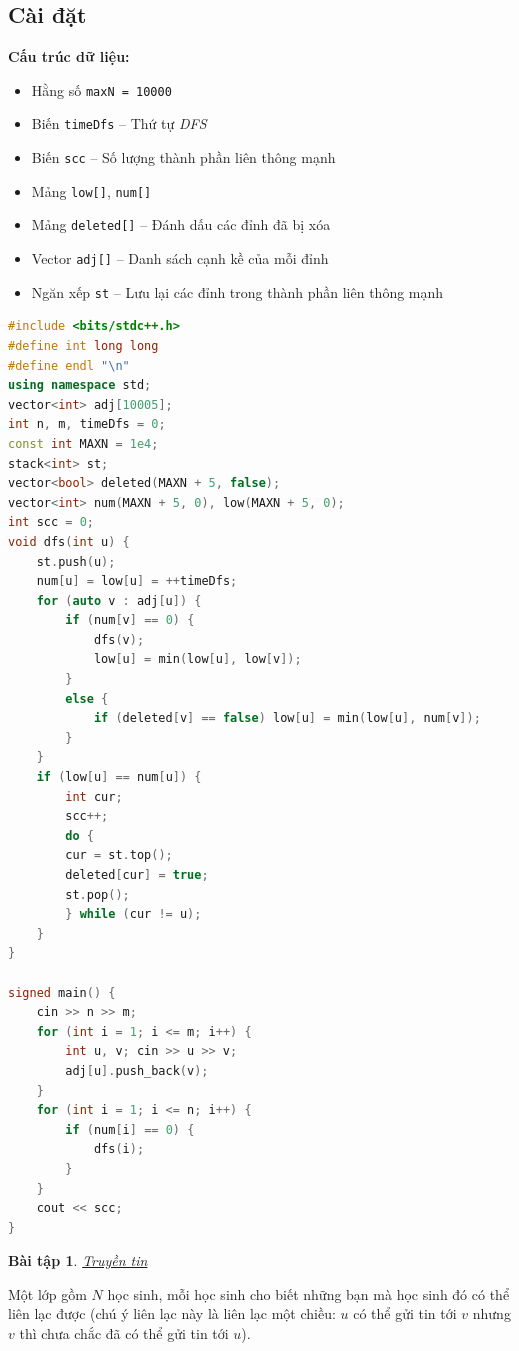 \documentclass{article}
\newtheorem{baitap}{Bài tập}
\begin{document}
\subsection*{Cài đặt}

\textbf{Cấu trúc dữ liệu:}
\begin{itemize}
    \item Hằng số \texttt{maxN = 10000}
    \item Biến \texttt{timeDfs} -- Thứ tự \textit{DFS}
    \item Biến \texttt{scc} -- Số lượng thành phần liên thông mạnh
    \item Mảng \texttt{low[]}, \texttt{num[]}
    \item Mảng \texttt{deleted[]} -- Đánh dấu các đỉnh đã bị xóa
    \item Vector \texttt{adj[]} -- Danh sách cạnh kề của mỗi đỉnh
    \item Ngăn xếp \texttt{st} -- Lưu lại các đỉnh trong thành phần liên thông mạnh
\end{itemize}

\begin{lstlisting}[language=C++]
#include <bits/stdc++.h>
#define int long long
#define endl "\n"
using namespace std;
vector<int> adj[10005];
int n, m, timeDfs = 0;
const int MAXN = 1e4;
stack<int> st;
vector<bool> deleted(MAXN + 5, false);
vector<int> num(MAXN + 5, 0), low(MAXN + 5, 0);
int scc = 0;
void dfs(int u) {
    st.push(u);
    num[u] = low[u] = ++timeDfs;
    for (auto v : adj[u]) {
        if (num[v] == 0) {
            dfs(v);
            low[u] = min(low[u], low[v]);
        }
        else {
            if (deleted[v] == false) low[u] = min(low[u], num[v]);
        }
    }
    if (low[u] == num[u]) {
        int cur;
        scc++;
        do {
        cur = st.top();
        deleted[cur] = true;
        st.pop();
        } while (cur != u);
    }
}

signed main() {
    cin >> n >> m;
    for (int i = 1; i <= m; i++) {
        int u, v; cin >> u >> v;
        adj[u].push_back(v);
    }    
    for (int i = 1; i <= n; i++) {
        if (num[i] == 0) {
            dfs(i);
        }
    }
    cout << scc;
}
\end{lstlisting}

\begin{baitap}
    \href{https://oj.vnoi.info/problem/message}{Truyền tin}
\end{baitap}

Một lớp gồm $N$ học sinh, mỗi học sinh cho biết những bạn mà học sinh đó có thể liên lạc được (chú ý liên lạc này là liên lạc một chiều: $u$ có thể gửi tin tới $v$ nhưng $v$ thì chưa chắc đã có thể gửi tin tới $u$).
\end{document}
